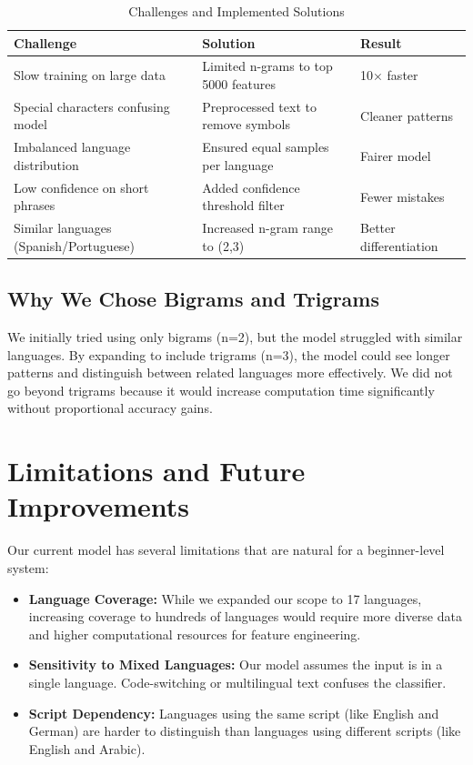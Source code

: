 \documentclass[conference]{IEEEtran}
\begin{document}
\begin{table}[h]
\centering
\caption{Challenges and Implemented Solutions}
\label{tab:challenges}

\begin{tabularx}{0.95\linewidth}{|X|X|X|}
\hline
\textbf{Challenge} & \textbf{Solution} & \textbf{Result} \\
\hline
Slow training on large data & Limited n-grams to top 5000 features & 10× faster \\
\hline
Special characters confusing model & Preprocessed text to remove symbols & Cleaner patterns \\
\hline
Imbalanced language distribution & Ensured equal samples per language & Fairer model \\
\hline
Low confidence on short phrases & Added confidence threshold filter & Fewer mistakes \\
\hline
Similar languages (Spanish/Portuguese) & Increased n-gram range to (2,3) & Better differentiation \\
\hline
\end{tabularx}

\end{table}

\subsection{Why We Chose Bigrams and Trigrams}

We initially tried using only bigrams (n=2), but the model struggled with similar languages. By expanding to include trigrams (n=3), the model could see longer patterns and distinguish between related languages more effectively. We did not go beyond trigrams because it would increase computation time significantly without proportional accuracy gains.

\section{Limitations and Future Improvements}

Our current model has several limitations that are natural for a beginner-level system:

\begin{itemize}
    \item \textbf{Language Coverage:} While we expanded our scope to 17 languages, increasing coverage to hundreds of languages would require more diverse data and higher computational resources for feature engineering.
    \item \textbf{Sensitivity to Mixed Languages:} Our model assumes the input is in a single language. Code-switching or multilingual text confuses the classifier.
    \item \textbf{Script Dependency:} Languages using the same script (like English and German) are harder to distinguish than languages using different scripts (like English and Arabic).
\end{itemize}
\end{document}
